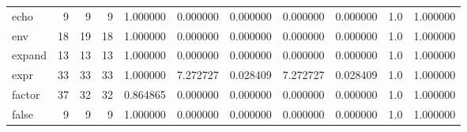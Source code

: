 \begin{longtable}{lrrrrrrrrrr}
echo      &                                       9 &                  9 &                                 9 &                                   1.000000 &                               0.000000 &                                     0.000000 &                          0.000000 &                                0.000000 &                                1.0 &                                           1.000000 \\
env       &                                      18 &                 19 &                                18 &                                   1.000000 &                               0.000000 &                                     0.000000 &                          0.000000 &                                0.000000 &                                1.0 &                                           1.000000 \\
expand    &                                      13 &                 13 &                                13 &                                   1.000000 &                               0.000000 &                                     0.000000 &                          0.000000 &                                0.000000 &                                1.0 &                                           1.000000 \\
expr      &                                      33 &                 33 &                                33 &                                   1.000000 &                               7.272727 &                                     0.028409 &                          7.272727 &                                0.028409 &                                1.0 &                                           1.000000 \\
factor    &                                      37 &                 32 &                                32 &                                   0.864865 &                               0.000000 &                                     0.000000 &                          0.000000 &                                0.000000 &                                1.0 &                                           1.000000 \\
false     &                                       9 &                  9 &                                 9 &                                   1.000000 &                               0.000000 &                                     0.000000 &                          0.000000 &                                0.000000 &                                1.0 &                                           1.000000 \\

\end{longtable}
